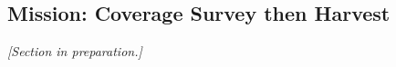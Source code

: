 \subsection{Mission: Coverage Survey then Harvest}
\label{sec:phaseB_mission}

\emph{[Section in preparation.]}
